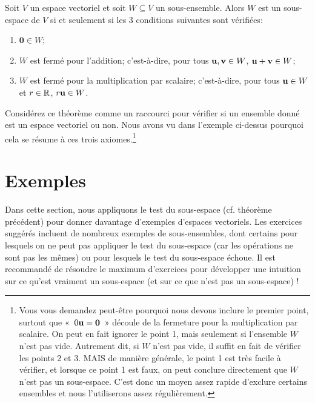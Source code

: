 \begin{theorem} 
Soit $V$ un espace vectoriel et soit $W \subseteq V$ un sous-ensemble. Alors $W$ est
un sous-espace de $V$ si et seulement si les 3 conditions suivantes sont v\'erifi\'ees:
\begin{enumerate}
\item
  $\mathbf 0 \in W$;
\item $W$ est fermé pour l'addition; c'est-\`a-dire, pour tous $\mathbf{u}, \mathbf{v} \in W$, $\mathbf{u}+\mathbf{v}\in W$;
\item $W$ est fermé pour la multiplication par scalaire; c'est-\`a-dire, pour tous
  $\mathbf{u} \in W$ et $r\in \mathbb{R}$, $r\mathbf{u}\in W$. 
\end{enumerate}
\end{theorem}

Considérez ce théorème comme un raccourci pour vérifier si
un ensemble donné est un espace vectoriel ou non. Nous avons vu dans
l'exemple ci-dessus pourquoi cela se résume à ces trois
axiomes.\footnote{Vous vous demandez peut-être pourquoi nous devons
  inclure le premier point, surtout que «~$0 \mathbf{u} = \mathbf 0$~» d\'ecoule de la fermeture pour la multiplication par scalaire.
  On peut en fait ignorer le point 1, mais seulement si l'ensemble $W$ n'est pas vide.
  Autrement dit, si $W$ n'est pas vide, il suffit en fait de vérifier les
  points 2 et 3. MAIS de manière générale, le point 1 est très facile à
  vérifier, et lorsque ce point 1 est faux, on peut conclure directement que $W$ n'est pas un
  sous-espace. C'est donc un moyen assez rapide d'exclure certains ensembles
  et nous l'utiliserons assez régulièrement.}

\section{Exemples} \label{many-examples}

Dans cette section, nous appliquons le test du sous-espace (cf. théorème précédent) pour donner davantage d'exemples d'espaces vectoriels. 
Les exercices suggérés incluent de nombreux exemples de sous-ensembles, dont certains pour lesquels on ne peut pas appliquer le test du sous-espace (car les
opérations ne sont pas les mêmes) ou pour lesquels le test du sous-espace échoue.
Il est recommand\'e de résoudre le maximum d'exercices pour développer une intuition sur ce qu'est vraiment un sous-espace (et sur ce que n'est pas un sous-espace) !

